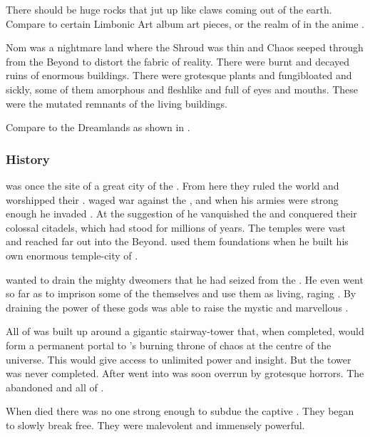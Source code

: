 There should be huge rocks that jut up like claws coming out of the earth. 
Compare to certain Limbonic Art album art pieces, or the realm of \Juujinkai{} in the anime \emph{\Urotsukidouji}. 

Nom was a nightmare land where the Shroud was thin and Chaos seeped through from the Beyond to distort the fabric of reality.
There were burnt and decayed ruins of enormous buildings.
There were grotesque plants and fungi\dash bloated and sickly, some of them amorphous and fleshlike and full of eyes and mouths. 
These were the mutated remnants of the living buildings. 

Compare to the Dreamlands as shown in \cite{MichaelNelson:FallofCthulhuII}. 





\subsubsection{History}
\Nom was once the site of a great city of the .
From here they ruled the world and worshipped their .
 waged war against the \shugul, and when his armies were strong enough he invaded \Nom.
At the suggestion of  he vanquished the \shugul and conquered their colossal citadels, which had stood for millions of years.
The \shugul temples were vast and reached far out into the Beyond.
\Sethicus used them foundations when he built his own enormous temple-city of .

\Sethicus wanted to drain the mighty dweomers that he had seized from the \shugul.
He even went so far as to imprison some of the \moongods themselves and use them as living, raging \dweomers. 
By draining the power of these gods \Sethicus was able to raise the mystic and marvellous \Baltherium. 

All of \Baltherium was built up around a gigantic stairway-tower that, when completed, would form a permanent portal to \RuinSatha's burning throne of chaos at the centre of the universe. 
This would give \Sethicus access to unlimited power and insight. 
But the tower was never completed. 
After \Sethicus went into  \Baltherium was soon overrun by grotesque horrors. 
The \dragons abandoned \Baltherium and all of \Nom.

When \Sethicus died there was no one strong enough to subdue the captive \moongods.
They began to slowly break free. 
They were malevolent and immensely powerful.





